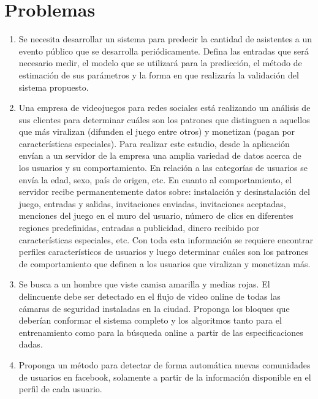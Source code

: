 \documentclass[a4paper,10pt,spanish,oneside]{article}
\begin{document}
\newpage

\section{Problemas}

\begin{enumerate}
\item Se necesita desarrollar un sistema para predecir la cantidad de asistentes a un evento público que se desarrolla periódicamente. Defina las entradas que será necesario medir, el modelo que se utilizará para la predicción, el método de estimación de sus parámetros y la forma en que realizaría la validación del sistema propuesto.

\item Una empresa de videojuegos para redes sociales está realizando un análisis de sus clientes para determinar cuáles son los patrones que distinguen a aquellos que más viralizan (difunden el juego entre otros) y monetizan (pagan por características especiales). Para realizar este estudio, desde la aplicación envían a un servidor de la empresa una amplia variedad de datos acerca de los usuarios y su comportamiento. En relación a las categorías de usuarios se envía la edad, sexo, país de origen, etc. En cuanto al comportamiento, el servidor recibe permanentemente datos sobre: instalación y desinstalación del juego, entradas y salidas, invitaciones enviadas, invitaciones aceptadas, menciones del juego en el muro del usuario, número de clics en diferentes
regiones predefinidas, entradas a publicidad, dinero recibido por características especiales, etc. Con toda esta información se requiere encontrar perfiles característicos de usuarios y luego determinar cuáles son los patrones de comportamiento que definen a los usuarios que viralizan y monetizan más.

\item Se busca a un hombre que viste camisa amarilla y medias rojas. El delincuente debe ser detectado en el flujo de video online de todas las cámaras de seguridad instaladas en la ciudad. Proponga los bloques que deberían conformar el sistema completo y los algoritmos tanto para el entrenamiento como para la búsqueda online a partir de las especificaciones dadas.

\item Proponga un método para detectar de forma automática nuevas comunidades de usuarios en facebook, solamente a partir de la información disponible en el perfil de cada usuario.


\end{enumerate}
\end{document}
